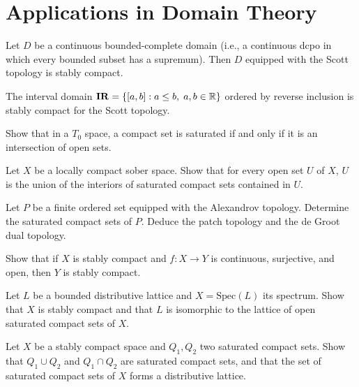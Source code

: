 \section{Applications in Domain Theory}

\begin{theorem}
Let $D$ be a continuous bounded-complete domain (i.e., a continuous dcpo in which every
bounded subset has a supremum). Then $D$ equipped with the Scott topology is stably compact.
\end{theorem}

\begin{corollary}
The interval domain $\mathbf{IR} = \{[a,b] : a \leq b, \; a,b \in \mathbb{R}\}$ ordered by
reverse inclusion is stably compact for the Scott topology.
\end{corollary}

\begin{exercise}
Show that in a $T_0$ space, a compact set is saturated if and only if it is an intersection
of open sets.
\end{exercise}

\begin{exercise}
Let $X$ be a locally compact sober space. Show that for every open set $U$ of $X$, $U$ is
the union of the interiors of saturated compact sets contained in $U$.
\end{exercise}

\begin{exercise}
Let $P$ be a finite ordered set equipped with the Alexandrov topology. Determine the
saturated compact sets of $P$. Deduce the patch topology and the de Groot dual topology.
\end{exercise}

\begin{exercise}
Show that if $X$ is stably compact and $f\colon X \to Y$ is continuous, surjective, and
open, then $Y$ is stably compact.
\end{exercise}

\begin{exercise}
Let $L$ be a bounded distributive lattice and $X = \mathrm{Spec}(L)$ its spectrum. Show
that $X$ is stably compact and that $L$ is isomorphic to the lattice of open saturated
compact sets of $X$.
\end{exercise}

\begin{exercise}
Let $X$ be a stably compact space and $Q_1, Q_2$ two saturated compact sets. Show that
$Q_1 \cup Q_2$ and $Q_1 \cap Q_2$ are saturated compact sets, and that the set of
saturated compact sets of $X$ forms a distributive lattice.
\end{exercise}
